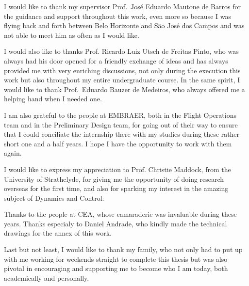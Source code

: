 \begin{agradecimentos}

    I would like to thank my supervisor Prof.\ José Eduardo Mautone de Barros for
    the guidance and support throughout this work, even more so because I was
    flying back and forth between Belo Horizonte and  São José dos Campos 
    and was not able to meet him as often as I would like.

    I would also like to thanks Prof. Ricardo Luiz Utsch de Freitas Pinto, who was
    always had his door opened for a friendly exchange of ideas and has always provided
    me with very enriching discussions, not only during the execution this work
    but also throughout my entire undergraduate course.  In the same spirit, I
    would like to thank Prof.\ Eduardo Bauzer de Medeiros, who always offered
    me a helping hand when I needed one.

    I am also grateful to the people at EMBRAER, both in the Flight Operations
    team and in the Preliminary Design team, for going out of their
    way to ensure that I could conciliate the internship there with my studies
    during these rather short one and a half years. I
    hope I have the opportunity to work with them again.

    I would like to express my appreciation to Prof. Christie Maddock, from the
    University of Strathclyde, for giving me the opportunity of doing research overseas for the first time,
    and also for sparking my interest in the amazing subject of Dynamics and Control.

    Thanks to the people at CEA, whose camaraderie was invaluable during these years. 
    Thanks especialy to Daniel Andrade, who kindly made the technical drawings 
    for the annex of this work.

    Last but not least, I would like to thank my family, who not only had to put up
    with me working for weekends straight to complete this thesis but was also
    pivotal in encouraging and supporting me to become who I am today, both
    academically and personally. 

\end{agradecimentos}

